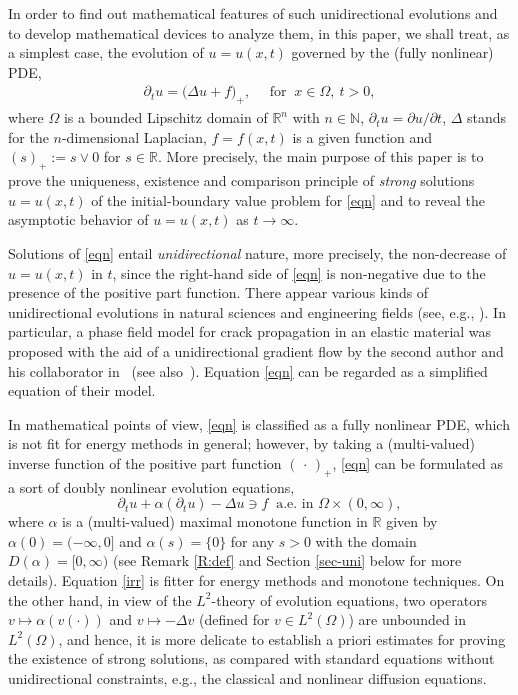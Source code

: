 \documentclass[reqno,10pt]{amsart}
\begin{document}
In order to find out mathematical features of such unidirectional
evolutions and to develop mathematical devices to analyze them, in this
paper, we shall treat, as a simplest case, the evolution of $u = u(x,t)$
governed by the (fully nonlinear) PDE,
\begin{align}\label{eqn}
\partial_t u
=\big(
\Delta u +f
\big)_+,
\quad \mbox{ for } \ x \in \Omega, \ t > 0,
\end{align}
where $\Omega$ is a bounded Lipschitz domain of ${{\mathbb R}}^n$ with $n\in{{\mathbb N}}$,
$\partial_t u = \partial u/\partial t$, $\Delta$ stands for the
$n$-dimensional Laplacian, $f = f(x,t)$ is a given function and $(s)_+ := s
\vee 0$ for $s \in {{\mathbb R}}$. More precisely, the main purpose of this paper
is to prove the uniqueness, existence and comparison principle of
\emph{strong} solutions $u = u(x,t)$ of the initial-boundary value
problem for \eqref{eqn} and to reveal the asymptotic behavior of $u =
u(x,t)$ as $t \to \infty$.

Solutions of \eqref{eqn} entail \emph{unidirectional} nature,
more precisely, the non-decrease of $u = u(x,t)$ in $t$, since the
right-hand side of \eqref{eqn} is non-negative due to the presence of the
positive part function.
There appear various kinds of unidirectional evolutions in natural
sciences and engineering fields (see, e.g., \cite{Fre01}). 
In particular, a phase field model for crack propagation in an elastic
material was proposed with the aid of a unidirectional gradient flow by
the second author and his collaborator in~\cite{K-T10, Tak09,
T-K09} (see also~\cite{AmbTor,FraMar98}). Equation \eqref{eqn} can be
regarded as a simplified equation of their model.

In mathematical points of view, \eqref{eqn} is classified as a
fully nonlinear PDE, which is not fit for energy methods in general;
however, by taking a (multi-valued) inverse function of the positive
part function $(\,\cdot\,)_+$, \eqref{eqn} can be formulated as
a sort of doubly nonlinear evolution equations,
\begin{equation}\label{irr}
\partial_t u + \alpha (\partial_t u) -\Delta u \ni f \
 \mbox{ a.e.~in } \Omega \times (0,\infty),
\end{equation}
where $\alpha$ is a (multi-valued) maximal monotone function in ${{\mathbb R}}$
given by $\alpha(0) = (-\infty,0]$ and $\alpha(s) = \{0\}$ for any $s
> 0$ with the domain $D(\alpha) = [0,\infty)$ (see Remark \ref{R:def} and
Section \ref{sec-uni} below for more details). Equation \eqref{irr} is
fitter for energy methods and monotone techniques.
On the other hand, in view of the $L^2$-theory of evolution equations, two
operators $v \mapsto \alpha (v(\cdot))$ and $v \mapsto -\Delta v$
(defined for $v \in L^2(\Omega)$) are unbounded in $L^2(\Omega)$, and
hence, it is more delicate to establish a priori estimates for proving
the existence of strong solutions, as compared with standard equations
without unidirectional constraints, e.g., the
classical and nonlinear diffusion equations.
\end{document}
